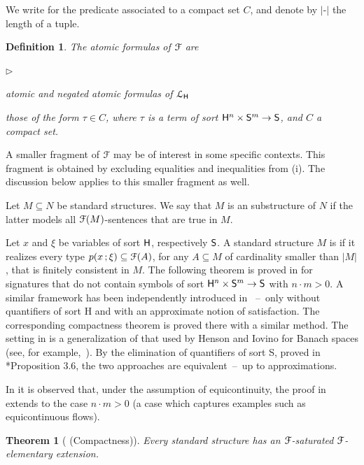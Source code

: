 \documentclass{amsproc}
\newcommand{\mylabel}[1]{{#1}\hfill}
\renewenvironment{itemize}
  {\begin{list}{$\triangleright$}{%
  \setlength{\parskip}{0mm}
  \setlength{\topsep}{.1\baselineskip}
  \setlength{\rightmargin}{0mm}
  \setlength{\listparindent}{0mm}
  \setlength{\itemindent}{0mm}
  \setlength{\labelwidth}{3ex}
  \setlength{\itemsep}{.1\baselineskip}
  \setlength{\parsep}{.1\baselineskip}
  \setlength{\partopsep}{0mm}
  \setlength{\labelsep}{1ex}
  \setlength{\leftmargin}{\labelwidth+\labelsep}
  \let\makelabel\mylabel}}{%
\end{list}}
\newcounter{thm}
\theoremstyle{mio}
\newtheorem{theorem}[thm]{Theorem}\tcolorboxenvironment{theorem}{mythm}
\newtheorem{definition}[thm]{Definition}\tcolorboxenvironment{definition}{mythm}
\renewcommand*{\emph}[1]{%
   \smash{\tikz[baseline]\node[rectangle, fill=teal!25, rounded corners, inner xsep=0.5ex, inner ysep=0.2ex, anchor=base, minimum height = 2.7ex]{\strut #1};}}
\begin{document}
We write \emph{$x\in C$\/} for the predicate associated to a compact set $C$, and denote by $|\mbox{-}|$ the length of a tuple.

\begin{definition}\label{def_atomic}
  The atomic formulas of ${\EuScript F}$ are
  \begin{itemize}
  \item[i.] atomic and negated atomic formulas of ${\EuScript L}_{\sf H}$
  \item[ii.] those of the form $\tau\in C$, where $\tau$ is a term of sort ${\sf H}^n\times {\sf S}^m\to {\sf S}$, and $C$ a compact set.
  \end{itemize}
\end{definition}

A smaller fragment of ${\EuScript F}$ may be of interest in some specific contexts.
This fragment is obtained by excluding equalities and inequalities from (i).
The discussion below applies to this smaller fragment as well.

Let $M\subseteq N$ be standard structures.
We say that $M$ is an \emph{${\EuScript F}$-elementary\/} substructure of $N$ if the latter models all ${\EuScript F}(M)$-sentences that are true in $M$.

Let $x$ and $\xi$ be variables of sort ${\sf H}$, respectively ${\sf S}$.
A standard structure $M$ is \emph{${\EuScript F}$-saturated\/} if it realizes every type $p(x\,;\xi)\subseteq{\EuScript F}(A)$, for any $A\subseteq M$ of cardinality smaller than $|M|$, that is finitely consistent in $M$.
The following theorem is proved in \cite{clcl} for signatures that do not contain symbols of sort ${\sf H}^n\times{\sf S}^m\to {\sf S}$ with $n{\cdot}m>0$.
A similar framework has been independently introduced in \cite{CP}~--~only without quantifiers of sort {\sf H} and with an approximate notion of satisfaction.
The corresponding compactness theorem is proved there with a similar method.
The setting in \cite{CP} is a generalization of that used by Henson and Iovino for Banach spaces (see, for example,~\cite{I}).
By the elimination of quantifiers of sort {\sf S}, proved in \cite{clcl}*{Proposition 3.6}, the two approaches are equivalent~--~up to approximations.

In \cite{Z} it is observed that, under the assumption of equicontinuity, the proof in \cite{clcl} extends to the case $n{\cdot}m> 0$ (a case which captures examples such as equicontinuous flows).

\begin{theorem}[ (Compactness)]\label{thm_compactness}
  Every standard structure has an ${\EuScript F}$-saturated ${\EuScript F}$-elementary extension.
\end{theorem}
\end{document}
